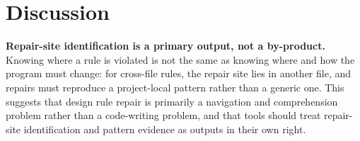 \section{Discussion}
\label{sec:discussion}

\textbf{Repair-site identification is a primary output, not a by-product.} Knowing where a
rule is violated is not the same as knowing where and how the program must
change: for cross-file rules, the repair site lies in another file, and
repairs must reproduce a project-local pattern rather than a generic
one. This suggests that design rule repair is primarily a navigation
and comprehension problem rather than a code-writing problem, and that
tools should treat repair-site identification and pattern evidence as
outputs in their own right.

